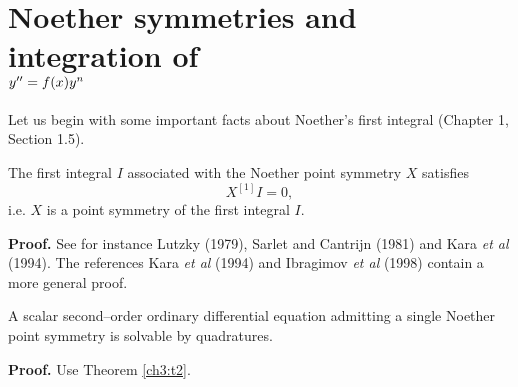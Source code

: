 \section{ Noether symmetries  and integration of \\
$\boldmath{y''=f(x)y^n}$} 

Let us begin with some important facts about Noether's first integral
(Chapter 1, Section 1.5). 
\begin{theo} \label{ch3:t2} \begin{em} The first integral $I$
associated with the Noether point symmetry $X$ satisfies 
\begin{equation}
X^{[1]}I=0,  \label{ch3:n7}
\end{equation}
i.e. $X$ is a point symmetry of the first
integral $I$.
\end{em} \end{theo}

{\bf Proof.} See for instance Lutzky (1979), Sarlet and Cantrijn (1981) and
Kara {\em et al} (1994). The
references Kara {\em et al} (1994) and Ibragimov {\em et al} (1998)
contain a more general proof.

\begin{theo}
\label{ch3:t3} \begin{em} A scalar second--order ordinary differential equation
admitting a single Noether point symmetry is solvable by quadratures. 
\end{em} \end{theo} 

{\bf Proof.} Use Theorem \ref{ch3:t2}.

